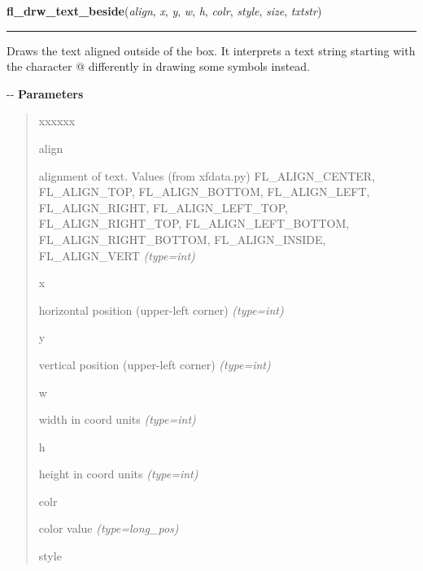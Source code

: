 \hspace{.8\funcindent}\begin{boxedminipage}{\funcwidth}

    \raggedright \textbf{fl\_drw\_text\_beside}(\textit{align}, \textit{x}, \textit{y}, \textit{w}, \textit{h}, \textit{colr}, \textit{style}, \textit{size}, \textit{txtstr})

    \vspace{-1.5ex}

    \rule{\textwidth}{0.5\fboxrule}
\setlength{\parskip}{2ex}

Draws the text aligned outside of the box. It interprets a text string
starting with the character @ differently in drawing some symbols instead.

-{}-
\setlength{\parskip}{1ex}
      \textbf{Parameters}
      \vspace{-1ex}

      \begin{quote}
        \begin{Ventry}{xxxxxx}

          \item[align]


alignment of text. Values (from xfdata.py) FL\_ALIGN\_CENTER,
FL\_ALIGN\_TOP, FL\_ALIGN\_BOTTOM, FL\_ALIGN\_LEFT, FL\_ALIGN\_RIGHT,
FL\_ALIGN\_LEFT\_TOP, FL\_ALIGN\_RIGHT\_TOP, FL\_ALIGN\_LEFT\_BOTTOM,
FL\_ALIGN\_RIGHT\_BOTTOM, FL\_ALIGN\_INSIDE, FL\_ALIGN\_VERT
            {\it (type=int)}

          \item[x]


horizontal position (upper-left corner)
            {\it (type=int)}

          \item[y]


vertical position (upper-left corner)
            {\it (type=int)}

          \item[w]


width in coord units
            {\it (type=int)}

          \item[h]


height in coord units
            {\it (type=int)}

          \item[colr]


color value
            {\it (type=long\_pos)}

          \item[style]



\end{Ventry}
\end{quote}
\end{boxedminipage}
